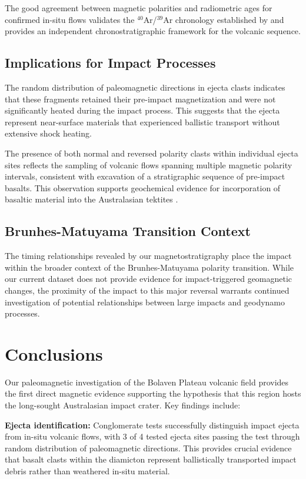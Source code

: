 \documentclass[twocolumn,11pt]{article}
\begin{document}
The good agreement between magnetic polarities and radiometric ages for confirmed in-situ flows validates the $^{40}$Ar/$^{39}$Ar chronology established by \citet{Sieh2019} and provides an independent chronostratigraphic framework for the volcanic sequence.

\subsection{Implications for Impact Processes}

The random distribution of paleomagnetic directions in ejecta clasts indicates that these fragments retained their pre-impact magnetization and were not significantly heated during the impact process. This suggests that the ejecta represent near-surface materials that experienced ballistic transport without extensive shock heating.

The presence of both normal and reversed polarity clasts within individual ejecta sites reflects the sampling of volcanic flows spanning multiple magnetic polarity intervals, consistent with excavation of a stratigraphic sequence of pre-impact basalts. This observation supports geochemical evidence for incorporation of basaltic material into the Australasian tektites \citep{Sieh2019}.

\subsection{Brunhes-Matuyama Transition Context}

The timing relationships revealed by our magnetostratigraphy place the impact within the broader context of the Brunhes-Matuyama polarity transition. While our current dataset does not provide evidence for impact-triggered geomagnetic changes, the proximity of the impact to this major reversal warrants continued investigation of potential relationships between large impacts and geodynamo processes.

\section{Conclusions}

Our paleomagnetic investigation of the Bolaven Plateau volcanic field provides the first direct magnetic evidence supporting the hypothesis that this region hosts the long-sought Australasian impact crater. Key findings include:

\textbf{Ejecta identification:} Conglomerate tests successfully distinguish impact ejecta from in-situ volcanic flows, with 3 of 4 tested ejecta sites passing the test through random distribution of paleomagnetic directions. This provides crucial evidence that basalt clasts within the diamicton represent ballistically transported impact debris rather than weathered in-situ material.
\end{document}
